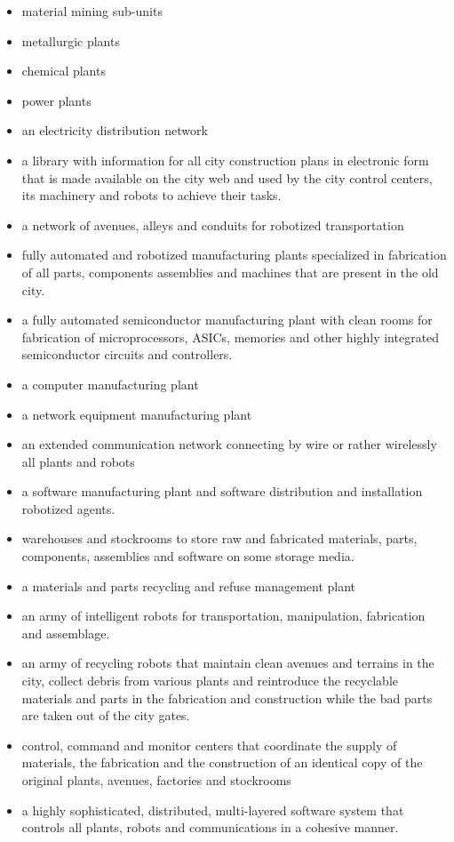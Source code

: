 \begin{itemize}
\item material mining sub-units 
\item metallurgic plants
\item chemical plants
\item power plants
\item an electricity distribution network
\item a library with information for all city construction plans in
electronic form that is made available on the city web and used by the
city control centers, its machinery and robots to achieve their tasks. 
\item a network of avenues, alleys and conduits for robotized
transportation
\item fully automated and robotized manufacturing plants specialized in
fabrication of all parts, components assemblies and machines that are
present in the old city.
\item a fully automated semiconductor manufacturing plant with clean
rooms for fabrication of microprocessors, ASICs, memories and other
highly integrated semiconductor circuits and controllers.
\item a computer manufacturing plant
\item a network equipment manufacturing plant
\item an extended communication network connecting by wire or rather
wirelessly all plants and robots
\item a software manufacturing plant and software distribution and
installation robotized agents.
\item warehouses and stockrooms to store raw and fabricated materials,
parts, components, assemblies and software on some storage media.
\item a materials and parts recycling and refuse management plant
\item an army of intelligent robots for transportation, manipulation,
fabrication and assemblage.
\item an army of recycling robots that maintain clean avenues and
terrains in the city, collect debris from various plants and
reintroduce the recyclable materials and parts in the fabrication and
construction while the bad parts are taken out of the city gates.
\item control, command and monitor centers that coordinate the supply of
materials, the fabrication and the construction of an identical copy of
the original plants, avenues, factories and stockrooms
\item a highly sophisticated, distributed, multi-layered software system
that controls all plants, robots and communications in a cohesive
manner.
\end{itemize}

